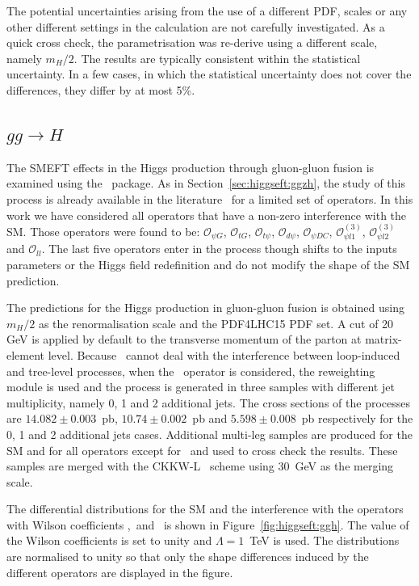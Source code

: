 The potential uncertainties arising from the use of a different PDF, scales or any other different settings in the calculation are not carefully investigated. As a quick cross check, the parametrisation was re-derive using a different scale, namely $m_H/2$. The results are typically consistent within the statistical uncertainty. In a few cases, in which the statistical uncertainty does not cover the differences, they differ by at most 5\%.

\subsection{$gg\to H$}
\label{sec:higgseft:section3}
The SMEFT effects in the Higgs production through gluon-gluon fusion is examined using the \SMEFTatNLO\ package. As in Section~\ref{sec:higgseft:ggzh}, the 
study of this process is already available in the literature~\cite{Deutschmann:2017qum} for a limited set of operators. In this work we have considered all operators that have a non-zero interference with the SM. Those operators were found to be:
$\mathcal{O}_{\psi G}$, $\mathcal{O}_{tG}$, $\mathcal{O}_{t\psi}$, $\mathcal{O}_{d\psi}$, $\mathcal{O}_{\psi DC}$, $\mathcal{O}_{\psi l1}^{(3)}$, $\mathcal{O}_{ \psi l2}^{(3)}$ and $\mathcal{O}_{ll}$.
The last five operators enter in the process though shifts to the inputs parameters or the Higgs field redefinition and do not modify the shape of the SM prediction.

The predictions for the Higgs production in gluon-gluon fusion is obtained using $m_H/2$ as the renormalisation scale and the PDF4LHC15 PDF set. A cut of 20 GeV is applied by default to the transverse momentum of the parton at matrix-element level. Because \Madgraph\ cannot deal with the interference between loop-induced and tree-level processes, when the \cpG\ operator is considered, the reweighting module is used and the process is generated in three samples with different jet multiplicity, namely 0, 1 and 2 additional jets. The cross sections of the processes are
$14.082 \pm 0.003$~pb, $10.74\pm0.002$~pb and $5.598\pm0.008$~pb respectively for the 0, 1 and 2 additional jets cases. Additional multi-leg samples are produced for the SM and for all operators except for \cpG\  and used to cross check the results. These samples are merged with the CKKW-L~\cite{Lonnblad:2001iq} scheme using $30$~GeV as the merging scale.


The differential distributions for the SM and the interference with the operators with Wilson coefficients \cpG ,\ctG\ and \ctp\ is shown in Figure~\ref{fig:higgseft:ggh}. The value of the Wilson coefficients is set to unity and $\Lambda=1$~TeV is used. The distributions are normalised to unity so that only the shape differences induced by the different operators are displayed in the figure.



